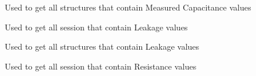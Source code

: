 \documentclass[letterpaper,10pt,english]{sphinxmanual}
\begin{document}

\begin{fulllineitems}
\label{\detokenize{app:app.getCmesStruct}}
\pysigstartsignatures
{}
\pysigstopsignatures
\sphinxAtStartPar
Used to get all structures that contain Measured Capacitance values

\end{fulllineitems}


\begin{fulllineitems}
\label{\detokenize{app:app.getLeakSess}}
\pysigstartsignatures
{}
\pysigstopsignatures
\sphinxAtStartPar
Used to get all session that contain Leakage values

\end{fulllineitems}


\begin{fulllineitems}
\label{\detokenize{app:app.getLeakStruct}}
\pysigstartsignatures
{}
\pysigstopsignatures
\sphinxAtStartPar
Used to get all structures that contain Leakage values

\end{fulllineitems}


\begin{fulllineitems}
\label{\detokenize{app:app.getRSess}}
\pysigstartsignatures
{}
\pysigstopsignatures
\sphinxAtStartPar
Used to get all session that contain Resistance values

\end{fulllineitems}
\end{document}
